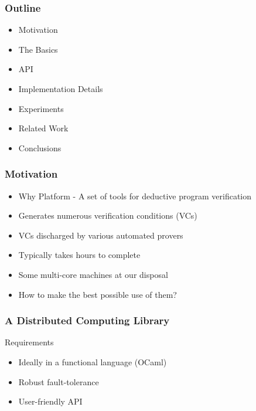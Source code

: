 \documentclass[xcolor=dvipsnames,8pt]{beamer}
\begin{document}

\begin{frame}\frametitle{Outline}
  \begin{itemize}
  \item Motivation
  \item The Basics
  \item API
  \item Implementation Details
  \item Experiments
  \item Related Work
  \item Conclusions
  \end{itemize}
\end{frame}


\begin{frame}\frametitle{Motivation}
  \begin{itemize}
  \item Why Platform - A set of tools for deductive program verification
  \item Generates numerous verification conditions (VCs)
  \item VCs discharged by various automated provers
  \item Typically takes hours to complete
  \end{itemize}
  \vspace{1cm}
  \begin{itemize}
  \item Some multi-core machines at our disposal
  \item How to make the best possible use of them?
  \end{itemize}
\end{frame}


\begin{frame}\frametitle {A Distributed Computing Library}
  Requirements
  \begin{itemize}
  \item Ideally in a functional language (OCaml)
  \item Robust fault-tolerance
  \item User-friendly API
  \end{itemize}
\end{frame}
\end{document}
